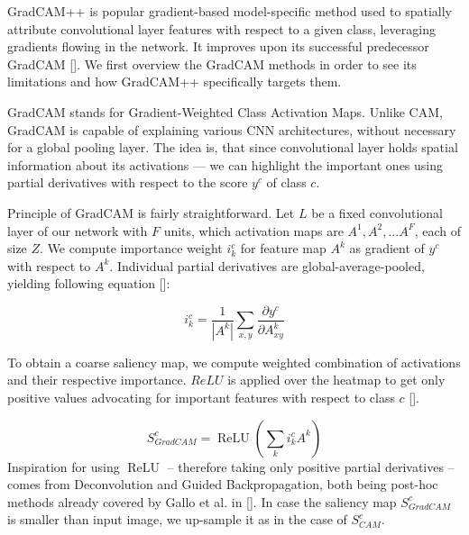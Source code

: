 GradCAM++ is popular gradient-based model-specific method used to spatially attribute convolutional layer features with respect to a given class, leveraging gradients flowing in the network. It improves upon its successful predecessor GradCAM []. We first overview the GradCAM methods in order to see its limitations and how GradCAM++ specifically targets them.\newline


\noindent
GradCAM stands for Gradient-Weighted Class Activation Maps. Unlike CAM, GradCAM is capable of explaining various CNN architectures, without necessary for a global pooling layer. The idea is, that since convolutional layer holds spatial information about its activations --- we can highlight the important ones using partial derivatives with respect to the score $y^c$ of class $c$.

Principle of GradCAM is fairly straightforward. Let $L$ be a fixed convolutional layer of our network with $F$ units, which activation maps are $A^1, A^2, ... A^F$, each of size $Z$. We compute importance weight $i^c_k$ for feature map $A^k$ as gradient of $y^c$ with respect to $A^k$. Individual partial derivatives are global-average-pooled, yielding following equation []:

\begin{equation}
    i^c_k = \frac{1}{|A^k|} \sum_{x,y} \frac{\partial y^c}{\partial\! A^k_{xy}}
\end{equation}

To obtain a coarse saliency map, we compute weighted combination of activations and their respective importance. $ReLU$ is applied over the heatmap to get only positive values advocating for important features with respect to class $c$ [].

\begin{equation}
    S^c_{GradCAM} = \operatorname{ReLU}(\sum_k i^c_k A^k)
\end{equation}
Inspiration for using $\operatorname{ReLU}$ -- therefore taking only positive partial derivatives -- comes from Deconvolution and Guided Backpropagation, both being post-hoc methods already covered by Gallo et al. in []. In case the saliency map $S^c_{GradCAM}$ is smaller than input image, we up-sample it as in the case of $S^c_{CAM}$.\newline

